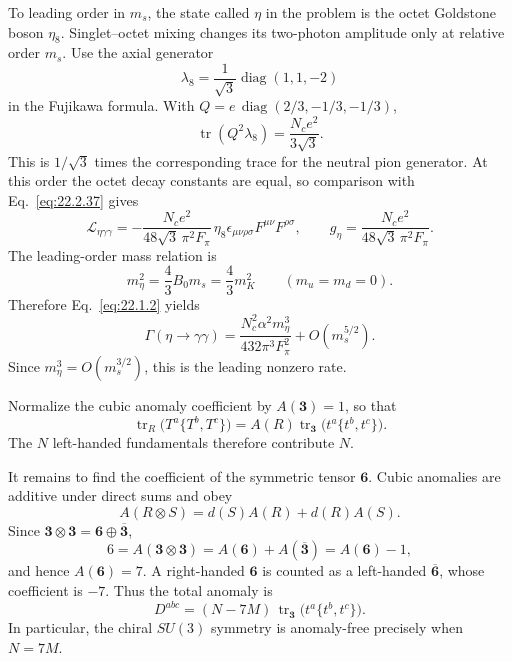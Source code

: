 \ExerciseEditorialNote

\begin{enumerate}
  To leading order in \(m_s\), the state called \(\eta\) in the problem
  is the octet Goldstone boson \(\eta_8\).  Singlet--octet mixing changes
  its two-photon amplitude only at relative order \(m_s\).  Use the
  axial generator
  \[
    \lambda_8=\frac1{\sqrt3}\operatorname{diag}(1,1,-2)
  \]
  in the Fujikawa formula.  With
  \(Q=e\,\operatorname{diag}(2/3,-1/3,-1/3)\),
  \[
    \operatorname{tr}(Q^2\lambda_8)
      =\frac{N_ce^2}{3\sqrt3}.
  \]
  This is \(1/\sqrt3\) times the corresponding trace for the neutral
  pion generator.  At this order the octet decay constants are equal,
  so comparison with Eq.~\eqref{eq:22.2.37} gives
  \[
    \mathcal L_{\eta\gamma\gamma}
      =-\frac{N_ce^2}{48\sqrt3\,\pi^2F_\pi}\,
        \eta_8\epsilon_{\mu\nu\rho\sigma}
        F^{\mu\nu}F^{\rho\sigma},
    \qquad
    g_\eta=\frac{N_ce^2}{48\sqrt3\,\pi^2F_\pi}.
  \]
  The leading-order mass relation is
  \[
    m_\eta^2=\frac43 B_0m_s=\frac43m_K^2
    \qquad (m_u=m_d=0).
  \]
  Therefore Eq.~\eqref{eq:22.1.2} yields
  \[
    \boxed{\Gamma(\eta\to\gamma\gamma)
      =\frac{N_c^2\alpha^2m_\eta^3}
             {432\pi^3F_\pi^2}
      +O(m_s^{5/2}).}
  \]
  Since \(m_\eta^3=O(m_s^{3/2})\), this is the leading nonzero rate.

  Normalize the cubic anomaly coefficient by
  \(A(\mathbf3)=1\), so that
  \[
    \operatorname{tr}_{R}
      \bigl(T^a\{T^b,T^c\}\bigr)
      =A(R)\operatorname{tr}_{\mathbf3}
      \bigl(t^a\{t^b,t^c\}\bigr).
  \]
  The \(N\) left-handed fundamentals therefore contribute \(N\).

  It remains to find the coefficient of the symmetric tensor
  \(\mathbf6\).  Cubic anomalies are additive under direct sums and obey
  \[
    A(R\otimes S)=d(S)A(R)+d(R)A(S).
  \]
  Since
  \(\mathbf3\otimes\mathbf3=\mathbf6\oplus\overline{\mathbf3}\),
  \[
    6=A(\mathbf3\otimes\mathbf3)
      =A(\mathbf6)+A(\overline{\mathbf3})
      =A(\mathbf6)-1,
  \]
  and hence \(A(\mathbf6)=7\).  A right-handed \(\mathbf6\) is counted
  as a left-handed \(\overline{\mathbf6}\), whose coefficient is
  \(-7\).  Thus the total anomaly is
  \[
    \boxed{D^{abc}
      =(N-7M)\,
       \operatorname{tr}_{\mathbf3}
       \bigl(t^a\{t^b,t^c\}\bigr).}
  \]
  In particular, the chiral \(SU(3)\) symmetry is anomaly-free precisely
  when \(N=7M\).


\end{enumerate}
